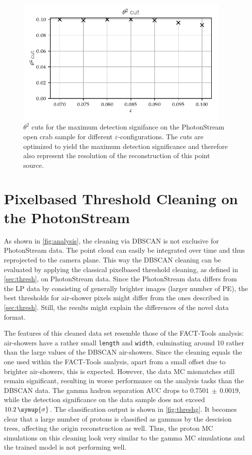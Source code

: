 \begin{figure}
  \centering
  \includegraphics[width=0.95\textwidth]{Plots/Epsilon/eps_theta_cut.pdf}
  \caption{$\theta^2$ cuts for the maximum detection signifance on the PhotonStream open crab sample for different $\varepsilon$-configurations. The cuts are optimized to yield the maximum detection significance and therefore also represent the resolution of the reconstruction of this point source.}
  \label{fig:eps_theta}
\end{figure}

\section{Pixelbased Threshold Cleaning on the PhotonStream}
%
As shown in \autoref{fig:analysis}, the cleaning via DBSCAN is not exclusive
for PhotonStream data. The point cloud can easily be integrated over time and
thus reprojected to the camera plane. This way the DBSCAN cleaning can be
evaluated by applying the classical pixelbased threshold cleaning, as defined
in \autoref{sec:thresh}, on PhotonStream data. Since the PhotonStream data
differs from the LP data by consisting of generally brighter images (larger number
of PE), the best thresholds for air-shower pixels might differ from the ones
described in \autoref{sec:thresh}. Still, the results might explain the
differences of the novel data format.

The features of this cleaned data set resemble those of the FACT-Tools
analysis: air-showers have a rather small \texttt{length} and \texttt{width},
culminating around \num{10} rather than the large values of the DBSCAN
air-showers. Since the cleaning equals the one used within the FACT-Tools
analysis, apart from a small offset due to brighter air-showers, this is
expected. However, the data MC mismatches still remain significant, resulting
in worse performance on the analysis tasks than the DBSCAN data. The gamma
hadron separation AUC drops to $0.7501\,\pm\,0.0019$, while the detection
significance on the data sample does not exceed $10.2\,\symup{\sigma}$. The
classification output is shown in \autoref{fig:threshg}. It becomes clear that
a large number of protons is classified as gammas by the descision trees, affecting the origin reconstruction as well. Thus,
the proton MC simulations on this cleaning look very similar to the gamma MC
simulations and the trained model is not performing well.

